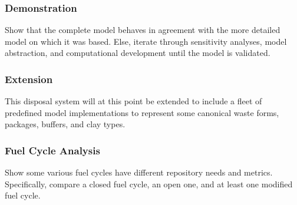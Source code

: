 \subsubsection{Demonstration}

Show that the complete model behaves in agreement with the more detailed model 
on which it was based. Else, iterate through sensitivity analyses, model 
abstraction, and computational development until the model is validated. 



\subsubsection{Extension}

This disposal system will at this point be extended to include a fleet of 
predefined model implementations to represent some canonical waste forms, 
packages, buffers, and clay types.  

\subsubsection{Fuel Cycle Analysis}

Show some various fuel cycles have different repository needs and metrics.  
Specifically, compare a closed fuel cycle, an open one, and at least one 
modified fuel cycle. 





